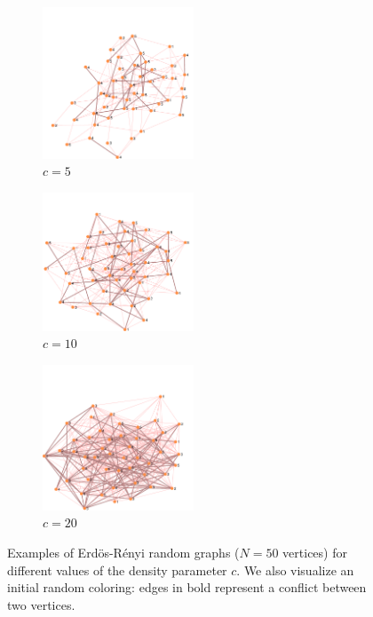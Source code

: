 \documentclass{report}
\begin{document}
  \begin{figure}[h]
      \centering
      \begin{subfigure}[t]{4.5cm}
        \centering
        \includegraphics[width=4.5cm]{figures/random-graph-50-5-5.pdf}
        \caption{$c = 5$}
      \end{subfigure}
      \quad
      \begin{subfigure}[t]{4.5cm}
        \centering
        \includegraphics[width=4.5cm]{figures/random-graph-50-10-5.pdf}
        \caption{$c = 10$}
      \end{subfigure}
      \quad
      \begin{subfigure}[t]{4.5cm}
        \centering
        \includegraphics[width=4.5cm]{figures/random-graph-50-20-5.pdf}
        \caption{$c = 20$}
      \end{subfigure}

    \caption{Examples of Erd\"{o}s-R\'{e}nyi random graphs ($N = 50$ vertices) for different values of the density parameter $c$. We also visualize an initial random coloring: edges in bold represent a conflict between two vertices.}\label{Fig:random-graph-examples}
  \end{figure}
\end{document}
